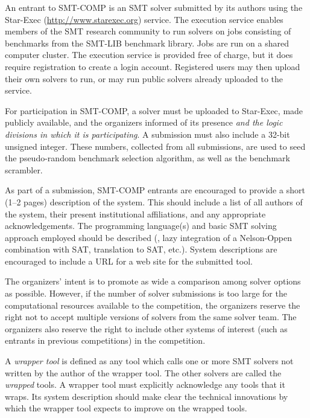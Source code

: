 \documentclass[12pt]{article}
\begin{document}
An entrant to SMT-COMP is an SMT solver
submitted by its authors using the Star-Exec (\url{http://www.starexec.org}) service.  
The execution service enables members of the
SMT research community to run solvers on jobs consisting of benchmarks
from the SMT-LIB benchmark library.  Jobs are run on a shared computer
cluster.  The execution service is provided free of
charge, but it does require registration to create a login account.  Registered users
may then upload their own solvers to run, or may run public solvers
already uploaded to the service.  


For participation in SMT-COMP, a solver must be
uploaded to Star-Exec, made publicly available, and the organizers informed of its presence {\em and the logic divisions in which it is participating}.
A submission must also include a 32-bit unsigned
integer.  These numbers, collected from all submissions, are used
to seed the pseudo-random benchmark selection algorithm, as well
as the benchmark scrambler.

As part of a submission,
SMT-COMP entrants are encouraged to provide a short (1--2 pages) description of
the system.  This should include a list of all authors of the system,
 their present institutional affiliations, and any appropriate acknowledgements.  The programming
language(s) and basic SMT solving approach employed should be
described (\eg, lazy integration of a Nelson-Oppen combination with
SAT, translation to SAT, etc.).  System descriptions are encouraged to
include a URL for a web site for the submitted tool.  

The organizers' intent is to promote as wide a comparison among solver options as possible.
However, if the number of solver submissions is too large for the
computational resources available to the competition, the organizers reserve the right not to
accept multiple versions of solvers from the same solver team.  The organizers also reserve the right to
include other systems of interest (such as entrants in previous competitions) in the
competition.

A \emph{wrapper tool} is defined as any tool
which calls one or more SMT solvers not written by the author of the wrapper
tool.  The other solvers are called the \emph{wrapped} tools.  
A wrapper tool must explicitly acknowledge any tools that it wraps.
Its system description should make clear the technical innovations  by which the
wrapper tool expects to improve on the wrapped tools.
\end{document}
